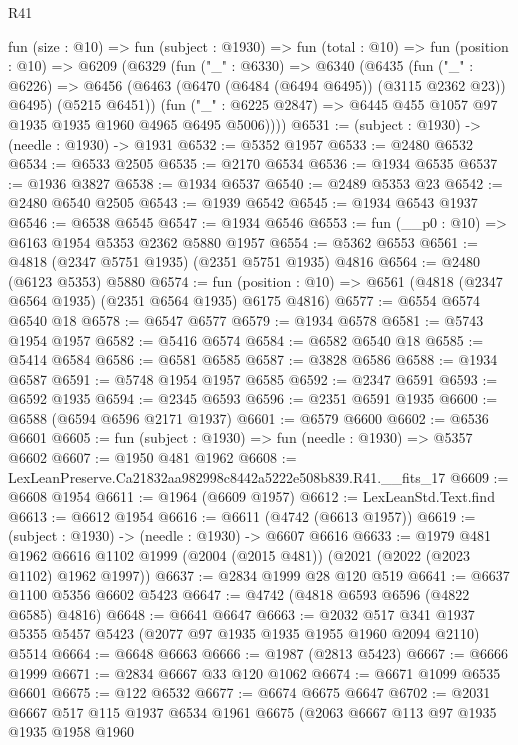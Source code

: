 \begin{lexlean}{R41}
\begin{coremodule}
  fun (size : @10) =>
  fun (subject : @1930) =>
  fun (total : @10) =>
  fun (position : @10) =>
  @6209
    (@6329
      (fun ("_" : @6330) =>
      @6340
        (@6435
          (fun ("_" : @6226) =>
          @6456 (@6463 (@6470 (@6484 (@6494 @6495)) (@3115 @2362 @23)) @6495) (@5215 @6451))
          (fun ("_" : @6225 @2847) => @6445 @455 @1057 @97 @1935 @1935 @1960 @4965 @6495 @5006))))
@6531 := (subject : @1930) -> (needle : @1930) -> @1931
@6532 := @5352 @1957
@6533 := @2480 @6532
@6534 := @6533 @2505
@6535 := @2170 @6534
@6536 := @1934 @6535
@6537 := @1936 @3827
@6538 := @1934 @6537
@6540 := @2489 @5353 @23
@6542 := @2480 @6540 @2505
@6543 := @1939 @6542
@6545 := @1934 @6543 @1937
@6546 := @6538 @6545
@6547 := @1934 @6546
@6553 := fun (__p0 : @10) => @6163 @1954 @5353 @2362 @5880 @1957
@6554 := @5362 @6553
@6561 := @4818 (@2347 @5751 @1935) (@2351 @5751 @1935) @4816
@6564 := @2480 (@6123 @5353) @5880
@6574 := fun (position : @10) => @6561 (@4818 (@2347 @6564 @1935) (@2351 @6564 @1935) @6175 @4816)
@6577 := @6554 @6574 @6540 @18
@6578 := @6547 @6577
@6579 := @1934 @6578
@6581 := @5743 @1954 @1957
@6582 := @5416 @6574
@6584 := @6582 @6540 @18
@6585 := @5414 @6584
@6586 := @6581 @6585
@6587 := @3828 @6586
@6588 := @1934 @6587
@6591 := @5748 @1954 @1957 @6585
@6592 := @2347 @6591
@6593 := @6592 @1935
@6594 := @2345 @6593
@6596 := @2351 @6591 @1935
@6600 := @6588 (@6594 @6596 @2171 @1937)
@6601 := @6579 @6600
@6602 := @6536 @6601
@6605 := fun (subject : @1930) => fun (needle : @1930) => @5357 @6602
@6607 := @1950 @481 @1962
@6608 := LexLeanPreserve.Ca21832aa982998c8442a5222e508b839.R41.__fits_17
@6609 := @6608 @1954
@6611 := @1964 (@6609 @1957)
@6612 := LexLeanStd.Text.find
@6613 := @6612 @1954
@6616 := @6611 (@4742 (@6613 @1957))
@6619 := (subject : @1930) -> (needle : @1930) -> @6607 @6616
@6633 := @1979
    @481
    @1962
    @6616
    @1102
    @1999
    (@2004 (@2015 @481))
    (@2021 (@2022 (@2023 @1102) @1962 @1997))
@6637 := @2834 @1999 @28 @120 @519
@6641 := @6637 @1100 @5356 @6602 @5423
@6647 := @4742 (@4818 @6593 @6596 (@4822 @6585) @4816)
@6648 := @6641 @6647
@6663 := @2032
    @517
    @341
    @1937
    @5355
    @5457
    @5423
    (@2077 @97 @1935 @1935 @1955 @1960 @2094 @2110)
    @5514
@6664 := @6648 @6663
@6666 := @1987 (@2813 @5423)
@6667 := @6666 @1999
@6671 := @2834 @6667 @33 @120 @1062
@6674 := @6671 @1099 @6535 @6601
@6675 := @122 @6532
@6677 := @6674 @6675 @6647
@6702 := @2031
    @6667
    @517
    @115
    @1937
    @6534
    @1961
    @6675
    (@2063
      @6667
      @113
      @97
      @1935
      @1935
      @1958
      @1960

\end{coremodule}
\end{lexlean}

